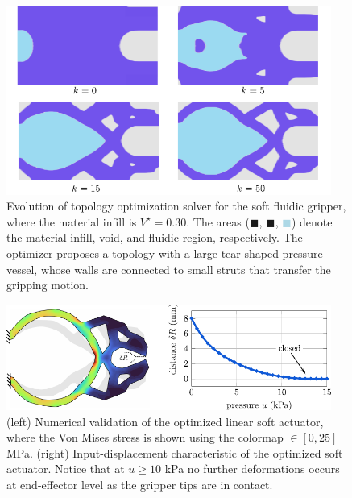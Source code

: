 \begin{figure}[!t]
  \centering
  \vspace{-3mm}
  \includegraphics*[width=0.95\textwidth]{./pdf/thesis-figure-3-7.pdf}
  \caption{\small Evolution of topology optimization solver for the soft fluidic gripper, where the material infill is $V^\star = 0.30$. The areas (\textcolor{matinfil}{$\blacksquare$}, \textcolor{lightvoid}{$\blacksquare$}, \textcolor{lightblue}{$\blacksquare$}) denote the material infill, void, and fluidic region, respectively. The optimizer proposes a topology with a large tear-shaped pressure vessel, whose walls are connected to small struts that transfer the gripping motion.}
  \label{fig:C3:topo_result_gripper}
  \vspace{-3mm}
\end{figure}

\begin{figure}[!t]
  \centering
  \vspace{-3mm}
  \includegraphics*[width=0.95\textwidth]{./pdf/thesis-figure-3-6.pdf}
  \caption{\small (left) Numerical validation of the optimized linear soft actuator, where the Von Mises stress is shown using the colormap \protect{}$\!\!\in [0,25]$ \si{\mega \pascal}. (right) Input-displacement characteristic of the optimized soft actuator. Notice that at $u \ge 10$ \si{\kilo \pascal} no further deformations occurs at end-effector level as the gripper tips are in contact.}
  \label{fig:C3:topo_result_gripper_fem}
\end{figure}


